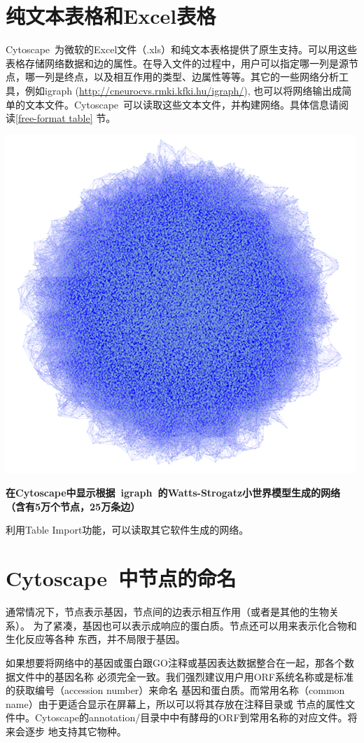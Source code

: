 \section{纯文本表格和Excel表格}

Cytoscape~为微软的Excel文件（.xls）和纯文本表格提供了原生支持。可以用这些表格存储网络数据和边的属性。在导入文件的过程中，用户可以指定哪一列是源节点，哪一列是终点，以及相互作用的类型、边属性等等。其它的一些网络分析工具，例如igraph (\url{http://cneurocvs.rmki.kfki.hu/igraph/}), 也可以将网络输出成简单的文本文件。Cytoscape~可以读取这些文本文件，并构建网络。具体信息请阅读\ref{free-format table} 节。

\centerline{\includegraphics[width=.7\textwidth]{images/huge_network_igraph.png}}

\textbf{在Cytoscape中显示根据~igraph~的Watts-Strogatz小世界模型生成的网络（含有5万个节点，25万条边）}
 
利用Table Import功能，可以读取其它软件生成的网络。
 
\section{Cytoscape~中节点的命名}

通常情况下，节点表示基因，节点间的边表示相互作用（或者是其他的生物关系）。
为了紧凑，基因也可以表示成响应的蛋白质。节点还可以用来表示化合物和生化反应等各种
东西，并不局限于基因。

如果想要将网络中的基因或蛋白跟GO注释或基因表达数据整合在一起，那各个数据文件中的基因名称
必须完全一致。我们强烈建议用户用ORF系统名称或是标准的获取编号（accession number）来命名
基因和蛋白质。而常用名称（common name）由于更适合显示在屏幕上，所以可以将其存放在注释目录或
节点的属性文件中。Cytoscape的annotation/目录中中有酵母的ORF到常用名称的对应文件。将来会逐步
地支持其它物种。


